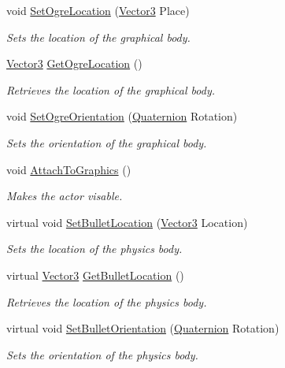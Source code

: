 \begin{DoxyCompactItemize}
void \hyperlink{classphys_1_1ActorBase_a192ced7c3191f3f9d4921aad73952046}{SetOgreLocation} (\hyperlink{classphys_1_1Vector3}{Vector3} Place)
\begin{DoxyCompactList}\small\item\em Sets the location of the graphical body. \item\end{DoxyCompactList}\item 
\hyperlink{classphys_1_1Vector3}{Vector3} \hyperlink{classphys_1_1ActorBase_a89642f74b0f2782f5f3bf1bed080939e}{GetOgreLocation} ()
\begin{DoxyCompactList}\small\item\em Retrieves the location of the graphical body. \item\end{DoxyCompactList}\item 
void \hyperlink{classphys_1_1ActorBase_a7b2d13cb1e8bba60eeae782a53fd5e49}{SetOgreOrientation} (\hyperlink{classphys_1_1Quaternion}{Quaternion} Rotation)
\begin{DoxyCompactList}\small\item\em Sets the orientation of the graphical body. \item\end{DoxyCompactList}\item 
void \hyperlink{classphys_1_1ActorBase_a45f190cb9b647bb3385d1298f9dab589}{AttachToGraphics} ()
\begin{DoxyCompactList}\small\item\em Makes the actor visable. \item\end{DoxyCompactList}\item 
virtual void \hyperlink{classphys_1_1ActorBase_aa7ab524d2905e640cea6324cce9ccfdb}{SetBulletLocation} (\hyperlink{classphys_1_1Vector3}{Vector3} Location)
\begin{DoxyCompactList}\small\item\em Sets the location of the physics body. \item\end{DoxyCompactList}\item 
virtual \hyperlink{classphys_1_1Vector3}{Vector3} \hyperlink{classphys_1_1ActorBase_ad543855adcc37dc9cdea4e264ca7953d}{GetBulletLocation} ()
\begin{DoxyCompactList}\small\item\em Retrieves the location of the physics body. \item\end{DoxyCompactList}\item 
virtual void \hyperlink{classphys_1_1ActorBase_a492244ac46ced53b809f436da992bc84}{SetBulletOrientation} (\hyperlink{classphys_1_1Quaternion}{Quaternion} Rotation)
\begin{DoxyCompactList}\small\item\em Sets the orientation of the physics body. \item\end{DoxyCompactList}\end{DoxyCompactItemize}
